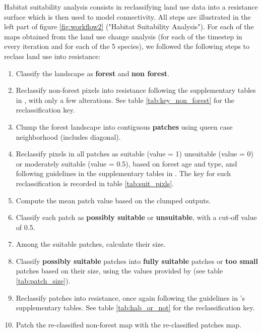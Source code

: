 Habitat suitability analysis consists in reclassifying land use data into a resistance surface which is then used to model connectivity. All steps are illustrated in the left part of figure \ref{fig:workflow2} ("Habitat Suitability Analysis"). For each of the maps obtained from the land use change analysis (for each of the timestep in every iteration and for each of the 5 species), we followed the following steps to reclass land use into resistance:
\begin{enumerate}
\item Classify the landscape as \textbf{forest} and \textbf{non forest}.
\item Reclassify non-forest pixels into resistance following the supplementary tables in \cite{rayfield_priorisation_2018}, with only a few alterations. See table \ref{tab:key_non_forest} for the reclassification key.
\item Clump the forest landscape into contiguous \textbf{patches} using queen case neighborhood (includes diagonal).
\item Reclassify pixels in all patches as suitable (value = 1) unsuitable (value = 0) or moderately suitable (value = 0.5), based on forest age and type, and following guidelines in the supplementary tables in  \cite{rayfield_priorisation_2018}.  The key for such reclassification is recorded in table \ref{tab:suit_pixls}.
\item  Compute the mean patch value based on the clumped outputs.
\item Classify each patch as \textbf{possibly suitable} or \textbf{unsuitable}, with a cut-off value of 0.5.
\item Among the suitable patches, calculate their size.
\item Classify \textbf{possibly suitable} patches into \textbf{fully suitable} patches or \textbf{too small} patches based on their size, using the values provided by \cite{rayfield_priorisation_2018} (see table \ref{tab:patch_size}).
\item Reclassify patches into resistance, once again following the guidelines in \cite{rayfield_priorisation_2018}'s supplementary tables. See table \ref{tab:hab_or_not} for the reclassification key.
\item Patch the re-classified non-forest map with the re-classified patches map. 
\end{enumerate}

